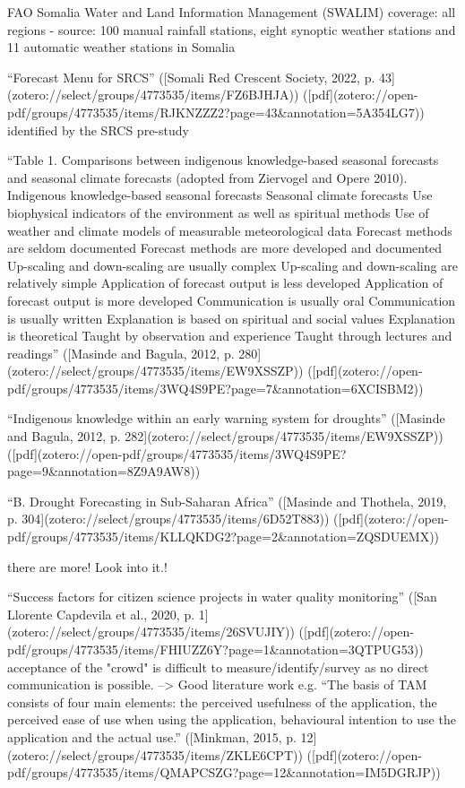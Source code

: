 FAO Somalia Water and Land Information Management (SWALIM) coverage: all regions - source: 100 manual rainfall stations, eight synoptic weather stations and 11 automatic weather stations in Somalia

“Forecast Menu for SRCS” ([Somali Red Crescent Society, 2022, p. 43](zotero://select/groups/4773535/items/FZ6BJHJA)) ([pdf](zotero://open-pdf/groups/4773535/items/RJKNZZZ2?page=43&annotation=5A354LG7))
identified by the SRCS pre-study

“Table 1. Comparisons between indigenous knowledge-based seasonal forecasts and seasonal climate forecasts (adopted from Ziervogel and Opere 2010). Indigenous knowledge-based seasonal forecasts Seasonal climate forecasts Use biophysical indicators of the environment as well as spiritual methods Use of weather and climate models of measurable meteorological data Forecast methods are seldom documented Forecast methods are more developed and documented Up-scaling and down-scaling are usually complex Up-scaling and down-scaling are relatively simple Application of forecast output is less developed Application of forecast output is more developed Communication is usually oral Communication is usually written Explanation is based on spiritual and social values Explanation is theoretical Taught by observation and experience Taught through lectures and readings” ([Masinde and Bagula, 2012, p. 280](zotero://select/groups/4773535/items/EW9XSSZP)) ([pdf](zotero://open-pdf/groups/4773535/items/3WQ4S9PE?page=7&annotation=6XCISBM2))

“Indigenous knowledge within an early warning system for droughts” ([Masinde and Bagula, 2012, p. 282](zotero://select/groups/4773535/items/EW9XSSZP)) ([pdf](zotero://open-pdf/groups/4773535/items/3WQ4S9PE?page=9&annotation=8Z9A9AW8))

“B. Drought Forecasting in Sub-Saharan Africa” ([Masinde and Thothela, 2019, p. 304](zotero://select/groups/4773535/items/6D52T883)) ([pdf](zotero://open-pdf/groups/4773535/items/KLLQKDG2?page=2&annotation=ZQSDUEMX))

there are more! Look into it.!



“Success factors for citizen science projects in water quality monitoring” ([San Llorente Capdevila et al., 2020, p. 1](zotero://select/groups/4773535/items/26SVUJIY)) ([pdf](zotero://open-pdf/groups/4773535/items/FHIUZZ6Y?page=1&annotation=3QTPUG53))
acceptance of the "crowd" is difficult to measure/identify/survey as no direct communication is possible. --> Good literature work e.g. “The basis of TAM consists of four main elements: the perceived usefulness of the application, the perceived ease of use when using the application, behavioural intention to use the application and the actual use.” ([Minkman, 2015, p. 12](zotero://select/groups/4773535/items/ZKLE6CPT)) ([pdf](zotero://open-pdf/groups/4773535/items/QMAPCSZG?page=12&annotation=IM5DGRJP))

